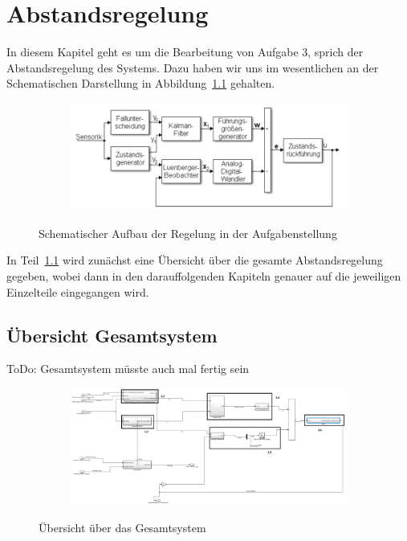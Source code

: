 \chapter{Abstandsregelung}\label{chp:Abstandsregelung}
In diesem Kapitel geht es um die Bearbeitung von Aufgabe 3, sprich der
Abstandsregelung des Systems. Dazu haben wir uns im wesentlichen an der
Schematischen Darstellung in Abbildung~\ref{fig:abstand_as} gehalten.
\begin{figure}[hbt]
\centering
\begin{subfigure}{0.69\textwidth}
    \centering
    \includegraphics*[width=\textwidth]{figures/abstand_aufgabenstelllung.png}
\end{subfigure}
    \caption{Schematischer Aufbau der Regelung in der Aufgabenstellung
    \label{fig:abstand_as}}
\end{figure}    
In Teil~\ref{sec:Übersicht Gesamtsystem} wird zunächst eine Übersicht über die
gesamte Abstandsregelung gegeben, wobei dann in den darauffolgenden Kapiteln
genauer auf die jeweiligen Einzelteile eingegangen wird.

\section{Übersicht Gesamtsystem}\label{sec:Übersicht Gesamtsystem}
ToDo: Gesamtsystem müsste auch mal fertig sein
\begin{figure}[hbt]
\centering
\begin{subfigure}{1.0\textwidth}
    \centering
    \includegraphics*[width=\textwidth]{figures/gesamtsystem.png}
\end{subfigure}
    \caption{Übersicht über das Gesamtsystem
    \label{fig:gesamt}}
\end{figure}    

